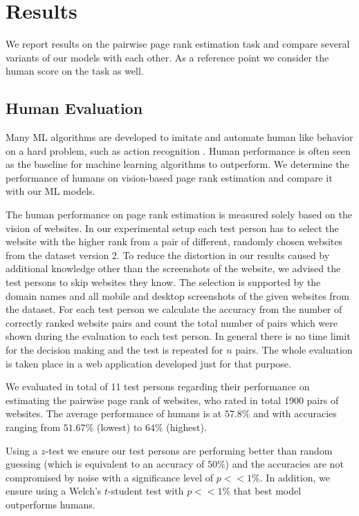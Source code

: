 \section{Results}

We report results on the pairwise page rank estimation task and compare several variants of our models with each other. As a reference point we consider the human score on the task as well.

\subsection{Human Evaluation}

Many ML algorithms are developed to imitate and automate human like behavior on a hard problem, such as action recognition \cite{gu2018ava}. Human performance is often seen as the baseline for machine learning algorithms to outperform. We determine the performance of humans on vision-based page rank estimation and compare it with our ML models. 

The human performance on page rank estimation is measured solely based on the vision of websites. In our experimental setup each test person has to select the website with the higher rank from a pair of different, randomly chosen websites from the dataset version 2. To reduce the distortion in our results caused by additional knowledge other than the screenshots of the website, we advised the test persons to skip websites they know. The selection is supported by the domain names and all mobile and desktop screenshots of the given websites from the dataset. For each test person we calculate the accuracy from the number of correctly ranked website pairs and count the total number of pairs which were shown during the evaluation to each test person. In general there is no time limit for the decision making and the test is repeated for $n$ pairs. The whole evaluation is taken place in a web application developed just for that purpose.

We evaluated in total of 11 test persons regarding their performance on estimating the pairwise page rank of websites, who rated in total $1900$ pairs of websites. The average performance of humans is at $57.8\%$ and with accuracies ranging from $51.67\%$ (lowest) to $64\%$ (highest).

Using a $z$-test we ensure our test persons are performing better than random guessing (which is equivalent to an accuracy of $50\%$) and the accuracies are not compromised by noise with a significance level of $p << 1\%$. In addition, we ensure using a Welch's $t$-student test with $p << 1\%$ that best model outperforms humans.

